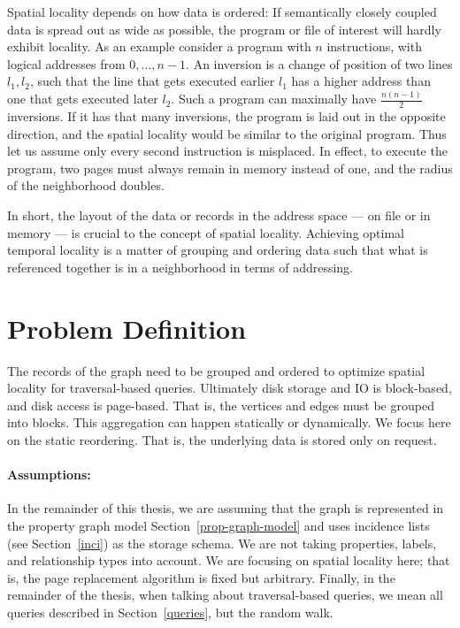     Spatial locality depends on how data is ordered:
    If semantically closely coupled data is spread out as wide as possible, the program or file of interest will hardly exhibit locality. 
    As an example consider a program with $n$ instructions, with logical addresses from $0, \dots, n-1$. 
    An inversion is a change of position of two lines $l_1, l_2$, such that the line that gets executed earlier $l_1$ has a higher address than one that gets executed later $l_2$.
    Such a program can maximally have $\frac{n (n-1)}{2}$ inversions. 
    If it has that many inversions, the program is laid out in the opposite direction, and the spatial locality would be similar to the original program.
    Thus let us assume only every second instruction is misplaced. 
    In effect, to execute the program, two pages must always remain in memory instead of one, and the radius of the neighborhood doubles.
    
    In short, the layout of the data or records in the address space --- on file or in memory --- is crucial to the concept of spatial locality. 
    Achieving optimal temporal locality is a matter of grouping and ordering data such that what is referenced together is in a neighborhood in terms of addressing.
    
          
\section{Problem Definition}\label{prob-def}
    The records of the graph need to be grouped and ordered to optimize spatial locality for traversal-based queries.
    Ultimately disk storage and IO is block-based, and disk access is page-based. 
    That is, the vertices and edges must be grouped into blocks.
    This aggregation can happen statically or dynamically. 
    We focus here on the static reordering.
    That is, the underlying data is stored only on request.
    
    \paragraph{Assumptions:}
    In the remainder of this thesis, we are assuming that the graph is represented in the property graph model Section~\ref{prop-graph-model} and uses incidence lists (see Section~\ref{inci}) as the storage schema. 
    We are not taking properties, labels, and relationship types into account.
    We are focusing on spatial locality here; that is, the page replacement algorithm is fixed but arbitrary.
    Finally, in the remainder of the thesis, when talking about traversal-based queries, we mean all queries described in Section~\ref{queries}, but the random walk.
    
